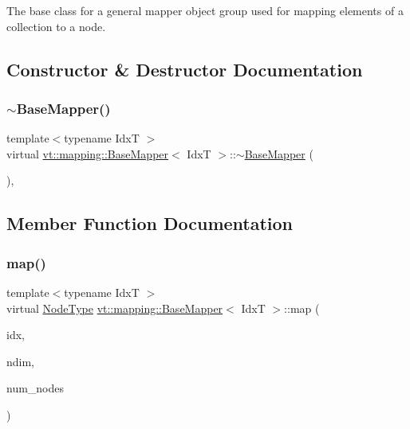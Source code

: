 The base class for a general mapper object group used for mapping elements of a collection to a node. 

\subsection{Constructor \& Destructor Documentation}
\mbox{\label{structvt_1_1mapping_1_1_base_mapper_acafa2909b2b0fd8e3a907562c099f722}} 
\subsubsection{\texorpdfstring{$\sim$\+Base\+Mapper()}{~BaseMapper()}}
{\footnotesize\ttfamily template$<$typename IdxT $>$ \\
virtual \hyperlink{structvt_1_1mapping_1_1_base_mapper}{vt\+::mapping\+::\+Base\+Mapper}$<$ IdxT $>$\+::$\sim$\hyperlink{structvt_1_1mapping_1_1_base_mapper}{Base\+Mapper} (\begin{DoxyParamCaption}{ }\end{DoxyParamCaption})\hspace{0.3cm}{\ttfamily [virtual]}, {\ttfamily [default]}}



\subsection{Member Function Documentation}
\mbox{\label{structvt_1_1mapping_1_1_base_mapper_a940a3ea301c0f60b2b88218afbce5a4f}} 
\subsubsection{\texorpdfstring{map()}{map()}}
{\footnotesize\ttfamily template$<$typename IdxT $>$ \\
virtual \hyperlink{namespacevt_a866da9d0efc19c0a1ce79e9e492f47e2}{Node\+Type} \hyperlink{structvt_1_1mapping_1_1_base_mapper}{vt\+::mapping\+::\+Base\+Mapper}$<$ IdxT $>$\+::map (\begin{DoxyParamCaption}\item[{IdxT $\ast$}]{idx,  }\item[{int}]{ndim,  }\item[{\hyperlink{namespacevt_a866da9d0efc19c0a1ce79e9e492f47e2}{Node\+Type}}]{num\+\_\+nodes }\end{DoxyParamCaption})\hspace{0.3cm}{\ttfamily [pure virtual]}}



